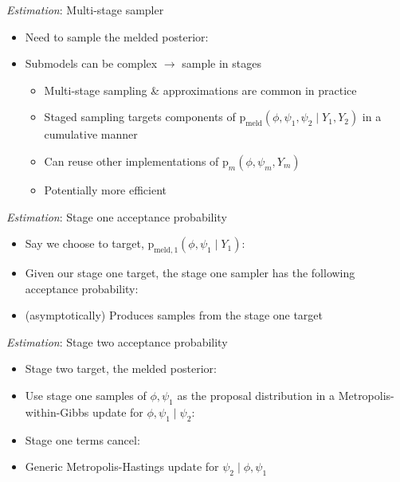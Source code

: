 \documentclass[10pt,ignorenonframetext,]{beamer}
\providecommand{\tightlist}{%
  \setlength{\itemsep}{0pt}\setlength{\parskip}{0pt}}
\newcommand{\pd}{\text{p}}
\newcommand{\modelindex}{m}
\begin{document}
\begin{frame}{\emph{Estimation}: Multi-stage sampler}

\begin{itemize}
\tightlist
\item
  Need to sample the melded posterior:
  
\item
  Submodels can be complex \(\rightarrow\) sample in stages

  \begin{itemize}
  \tightlist
  \item
    Multi-stage sampling \& approximations are common in practice
  \item
    Staged sampling targets components of
    \(\pd_{\text{meld}}(\phi, \psi_{1}, \psi_{2} \mid Y_{1}, Y_{2})\) in
    a cumulative manner
  \item
    Can reuse other implementations of
    \(\pd_{m}(\phi, \psi_{\modelindex}, Y_{\modelindex})\)
  \item
    Potentially more efficient
  \end{itemize}
\end{itemize}

\end{frame}

\begin{frame}{\emph{Estimation}: Stage one acceptance probability}

\begin{itemize}
\tightlist
\item
  Say we choose to target,
  \(\pd_{\text{meld}, 1}(\phi, \psi_{1} \mid Y_{1})\):
  
\item
  Given our stage one target, the stage one sampler has the following
  acceptance probability:
   
\item
  (asymptotically) Produces samples from the stage one target
\end{itemize}

\end{frame}

\begin{frame}{\emph{Estimation}: Stage two acceptance probability}

\begin{itemize}
\tightlist
\item
  Stage two target, the melded posterior:
  
\item
  Use stage one samples of \(\phi, \psi_{1}\) as the proposal
  distribution in a Metropolis-within-Gibbs update for
  \(\phi, \psi_{1} \mid \psi_{2}\):
  
\item
  Stage one terms cancel:
  
\item
  Generic Metropolis-Hastings update for
  \(\psi_{2} \mid \phi, \psi_{1}\) 
\end{itemize}

\end{frame}
\end{document}
